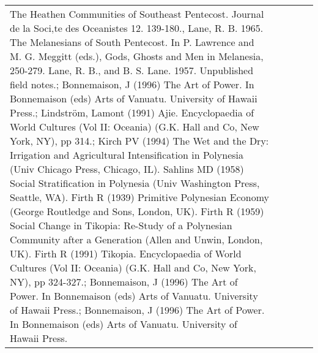 \begin{longtable}{p{2cm}p{2cm}p{2cm}p{5cm}p{7cm}}
The Heathen Communities of Southeast Pentecost. Journal de la Soci‚te des Oceanistes 12. 139-180., Lane, R. B. 1965. The Melanesians of South Pentecost. In P. Lawrence and M. G. Meggitt (eds.), Gods, Ghosts and Men in Melanesia, 250-279. Lane, R. B., and B. S. Lane. 1957. Unpublished field notes.; Bonnemaison, J (1996) The Art of Power. In Bonnemaison (eds) Arts of Vanuatu. University of Hawaii Press.; Lindström, Lamont (1991) Ajie. Encyclopaedia of World Cultures (Vol II: Oceania) (G.K. Hall and Co, New York, NY), pp 314.; Kirch PV (1994) The Wet and the Dry: Irrigation and Agricultural Intensification in Polynesia (Univ Chicago Press, Chicago, IL). Sahlins MD (1958) Social Stratification in Polynesia (Univ Washington Press, Seattle, WA). Firth R (1939) Primitive Polynesian Economy (George Routledge and Sons, London, UK). Firth R (1959) Social Change in Tikopia: Re-Study of a Polynesian Community after a Generation (Allen and Unwin, London, UK). Firth R (1991) Tikopia. Encyclopaedia of World Cultures (Vol II: Oceania) (G.K. Hall and Co, New York, NY), pp 324-327.; Bonnemaison, J (1996) The Art of Power. In Bonnemaison (eds) Arts of Vanuatu. University of Hawaii Press.; Bonnemaison, J (1996) The Art of Power. In Bonnemaison (eds) Arts of Vanuatu. University of Hawaii Press. \\ 

\end{longtable}
